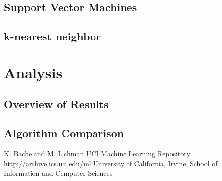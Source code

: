 \documentclass{sig-alternate}
\begin{document}
\subsection{Support Vector Machines}

\subsection{k-nearest neighbor}


\section{Analysis}

\subsection{Overview of Results}

\subsection{Algorithm Comparison}





\begin{thebibliography}{10}

K. Bache and M. Lichman
\newblock UCI Machine Learning Repository
\newblock http://archive.ics.uci.edu/ml
\newblock University of California, Irvine, School of Information and Computer Sciences


\end{thebibliography}
\end{document}
